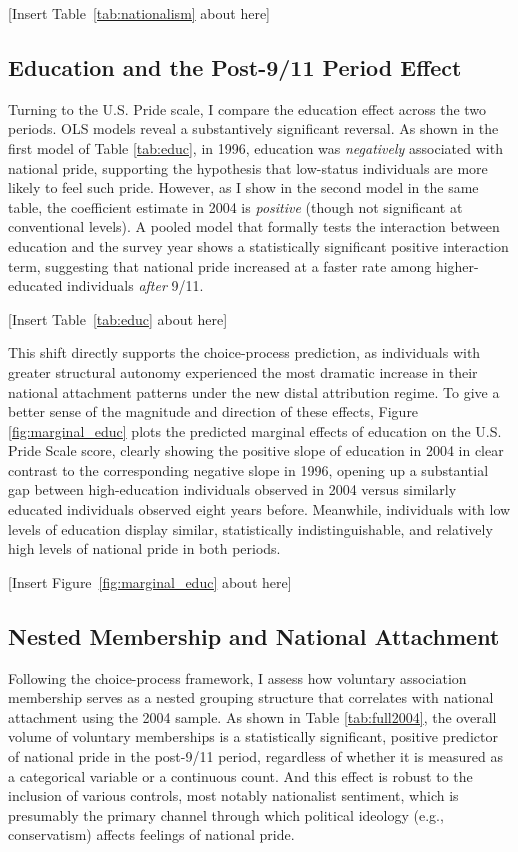 \documentclass[12pt,letterpaper]{article}
\begin{document}
[Insert Table~\ref{tab:nationalism} about here]

\subsection{Education and the Post-9/11 Period Effect}

Turning to the U.S. Pride scale, I compare the education effect across the two periods. OLS models reveal a substantively significant reversal. As shown in the first model of Table \ref{tab:educ}, in 1996, education was \textit{negatively }associated with national pride, supporting the hypothesis that low-status individuals are more likely to feel such pride. However, as I show in the second model in the same table, the coefficient estimate in 2004 is \textit{positive} (though not significant at conventional levels). A pooled model that formally tests the interaction between education and the survey year shows a statistically significant positive interaction term, suggesting that national pride increased at a faster rate among higher-educated individuals \textit{after} 9/11. 

[Insert Table~\ref{tab:educ} about here]

This shift directly supports the choice-process prediction, as individuals with greater structural autonomy experienced the most dramatic increase in their national attachment patterns under the new distal attribution regime. To give a better sense of the magnitude and direction of these effects, Figure \ref{fig:marginal_educ} plots the predicted marginal effects of education on the U.S. Pride Scale score, clearly showing the positive slope of education in 2004 in clear contrast to the corresponding negative slope in 1996, opening up a substantial gap between high-education individuals observed in 2004 versus similarly educated individuals observed eight years before. Meanwhile, individuals with low levels of education display similar, statistically indistinguishable, and relatively high levels of national pride in both periods. 

[Insert Figure~\ref{fig:marginal_educ} about here]

\subsection{Nested Membership and National Attachment}

Following the choice-process framework, I assess how voluntary association membership serves as a nested grouping structure that correlates with national attachment using the 2004 sample. As shown in Table \ref{tab:full2004}, the overall volume of voluntary memberships is a statistically significant, positive predictor of national pride in the post-9/11 period, regardless of whether it is measured as a categorical variable or a continuous count. And this effect is robust to the inclusion of various controls, most notably nationalist sentiment, which is presumably the primary channel through which political ideology (e.g., conservatism) affects feelings of national pride. 
\end{document}
